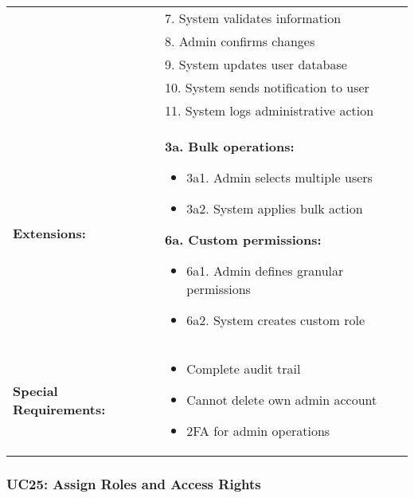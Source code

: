 \documentclass[12pt]{article}
\begin{document}
\begin{tabular}{|p{3cm}|p{11cm}|}
& 7. System validates information \\
& 8. Admin confirms changes \\
& 9. System updates user database \\
& 10. System sends notification to user \\
& 11. System logs administrative action \\
\hline
\textbf{Extensions:} & 
\textbf{3a. Bulk operations:}
\begin{itemize}
    \item 3a1. Admin selects multiple users
    \item 3a2. System applies bulk action
\end{itemize}
\textbf{6a. Custom permissions:}
\begin{itemize}
    \item 6a1. Admin defines granular permissions
    \item 6a2. System creates custom role
\end{itemize} \\
\hline
\textbf{Special Requirements:} & 
\begin{itemize}
    \item Complete audit trail
    \item Cannot delete own admin account
    \item 2FA for admin operations
\end{itemize} \\
\hline
\end{tabular}


\subsubsection{UC25: Assign Roles and Access Rights}
\end{document}
